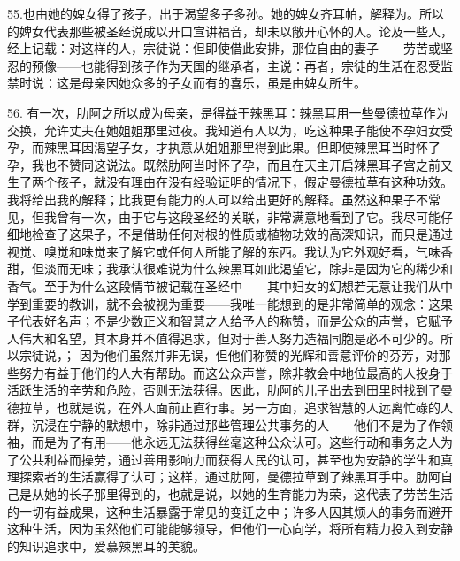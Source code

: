 55.\newline{}也由她的婢女得了孩子，出于渴望多子多孙。她的婢女齐耳帕，解释为\newline{}。所以\newline{}的婢女代表那些被圣经说成以开口宣讲福音，却未以敞开心怀的人。论及一些人，经上记载：\newline{}对这样的人，宗徒说：\newline{}但即使借此安排，\newline{}那位自由的妻子——劳苦或坚忍的预像——也能得到孩子作为天国的继承者，主说：\newline{}再者，宗徒的生活在忍受监禁时说：\newline{}这是母亲因她众多的子女而有的喜乐，虽是由婢女所生。\par

56. 有一次，肋阿之所以成为母亲，是得益于辣黑耳：辣黑耳用一些曼德拉草作为交换，允许丈夫在她姐姐那里过夜。我知道有人以为，吃这种果子能使不孕妇女受孕，而辣黑耳因渴望子女，才执意从姐姐那里得到此果。但即使辣黑耳当时怀了孕，我也不赞同这说法。既然肋阿当时怀了孕，而且在天主开启辣黑耳子宫之前又生了两个孩子，就没有理由在没有经验证明的情况下，假定曼德拉草有这种功效。我将给出我的解释；比我更有能力的人可以给出更好的解释。虽然这种果子不常见，但我曾有一次，由于它与这段圣经的关联，非常满意地看到了它。我尽可能仔细地检查了这果子，不是借助任何对根的性质或植物功效的高深知识，而只是通过视觉、嗅觉和味觉来了解它或任何人所能了解的东西。我认为它外观好看，气味香甜，但淡而无味；我承认很难说为什么辣黑耳如此渴望它，除非是因为它的稀少和香气。至于为什么这段情节被记载在圣经中——其中妇女的幻想若无意让我们从中学到重要的教训，就不会被视为重要——我唯一能想到的是非常简单的观念：这果子代表好名声；不是少数正义和智慧之人给予人的称赞，而是公众的声誉，它赋予人伟大和名望，其本身并不值得追求，但对于善人努力造福同胞是必不可少的。所以宗徒说，； 因为他们虽然并非无误，但他们称赞的光辉和善意评价的芬芳，对那些努力有益于他们的人大有帮助。而这公众声誉，除非教会中地位最高的人投身于活跃生活的辛劳和危险，否则无法获得。因此，肋阿的儿子出去到田里时找到了曼德拉草，也就是说，在外人面前正直行事。另一方面，追求智慧的人远离忙碌的人群，沉浸在宁静的默想中，除非通过那些管理公共事务的人——他们不是为了作领袖，而是为了有用——他永远无法获得丝毫这种公众认可。这些行动和事务之人为了公共利益而操劳，通过善用影响力而获得人民的认可，甚至也为安静的学生和真理探索者的生活赢得了认可；这样，通过肋阿，曼德拉草到了辣黑耳手中。肋阿自己是从她的长子那里得到的，也就是说，以她的生育能力为荣，这代表了劳苦生活的一切有益成果，这种生活暴露于常见的变迁之中；许多人因其烦人的事务而避开这种生活，因为虽然他们可能能够领导，但他们一心向学，将所有精力投入到安静的知识追求中，爱慕辣黑耳的美貌。\par

